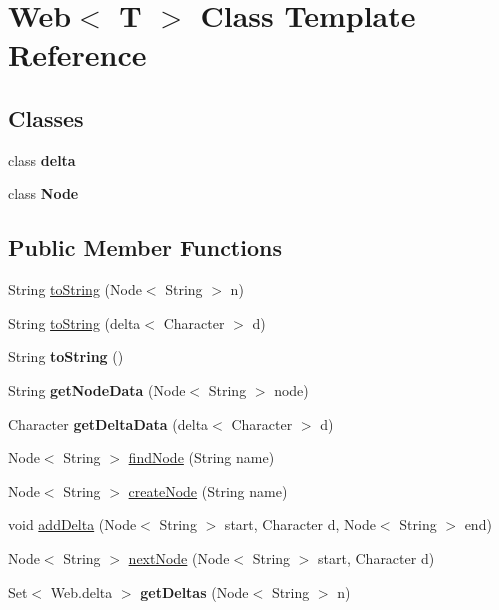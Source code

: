 \hypertarget{class_web}{}\section{Web$<$ T $>$ Class Template Reference}
\label{class_web}
\subsection*{Classes}
\begin{DoxyCompactItemize}
\item 
class {\bfseries delta}
\item 
class {\bfseries Node}
\end{DoxyCompactItemize}
\subsection*{Public Member Functions}
\begin{DoxyCompactItemize}
\item 
String \mbox{\hyperlink{class_web_afa2f7442238f2fc0aaa39861398d0240}{to\+String}} (Node$<$ String $>$ n)
\item 
String \mbox{\hyperlink{class_web_adedf3de84f0f3c9350af5b54219b69ee}{to\+String}} (delta$<$ Character $>$ d)
\item 
\mbox{\label{class_web_ab83bbd9a954c513025582e0162a3c3c2}} 
String {\bfseries to\+String} ()
\item 
\mbox{\label{class_web_a94907f5efb2b56501d03d491a3b4ad8b}} 
String {\bfseries get\+Node\+Data} (Node$<$ String $>$ node)
\item 
\mbox{\label{class_web_ac4e61d8f80be4c96c7bc4760a2e6ad0b}} 
Character {\bfseries get\+Delta\+Data} (delta$<$ Character $>$ d)
\item 
Node$<$ String $>$ \mbox{\hyperlink{class_web_a50049ebc833e785dde56385a94790f2f}{find\+Node}} (String name)
\item 
Node$<$ String $>$ \mbox{\hyperlink{class_web_a5d7f78dc2b709da693a67e168a880411}{create\+Node}} (String name)
\item 
void \mbox{\hyperlink{class_web_a5bccfa9eddb9815feccc8d0bd8cdb083}{add\+Delta}} (Node$<$ String $>$ start, Character d, Node$<$ String $>$ end)
\item 
Node$<$ String $>$ \mbox{\hyperlink{class_web_a98350d3dc6cc4db4aa769972a56beb8f}{next\+Node}} (Node$<$ String $>$ start, Character d)
\item 
\mbox{\label{class_web_a9baab6b4e28c4eacb16bd54c54140589}} 
Set$<$ Web.\+delta $>$ {\bfseries get\+Deltas} (Node$<$ String $>$ n)
\end{DoxyCompactItemize}
